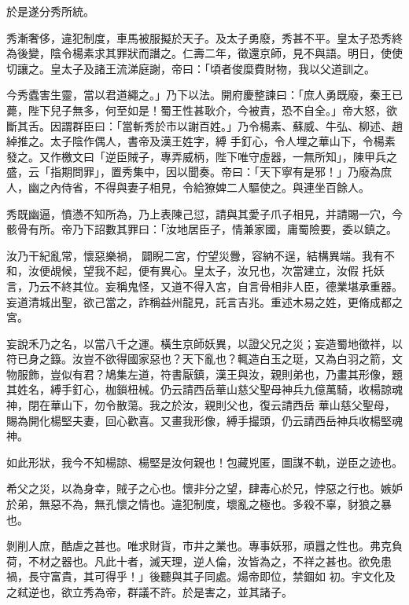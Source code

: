 \begin{pinyinscope}
 於是遂分秀所統。



 秀漸奢侈，違犯制度，車馬被服擬於天子。及太子勇廢，秀甚不平。皇太子恐秀終為後變，陰令楊素求其罪狀而譖之。仁壽二年，徵還京師，見不與語。明日，使使切讓之。皇太子及諸王流涕庭謝，帝曰：「頃者俊糜費財物，我以父道訓之。



 今秀蠹害生靈，當以君道繩之。」乃下以法。開府慶整諫曰：「庶人勇既廢，秦王已薨，陛下兒子無多，何至如是！蜀王性甚耿介，今被責，恐不自全。」帝大怒，欲斷其舌。因謂群臣曰：「當斬秀於市以謝百姓。」乃令楊素、蘇威、牛弘、柳述、趙綽推之。太子陰作偶人，書帝及漢王姓字，縛
 手釘心，令人埋之華山下，令楊素發之。又作檄文曰「逆臣賊子，專弄威柄，陛下唯守虛器，一無所知」，陳甲兵之盛，云「指期問罪」，置秀集中，因以聞奏。帝曰：「天下寧有是邪！」乃廢為庶人，幽之內侍省，不得與妻子相見，令給獠婢二人驅使之。與連坐百餘人。



 秀既幽逼，憤懣不知所為，乃上表陳己愆，請與其愛子爪子相見，并請賜一穴，今骸骨有所。帝乃下詔數其罪曰：「汝地居臣子，情兼家國，庸蜀險要，委以鎮之。



 汝乃干紀亂常，懷惡樂禍，闢睨二宮，佇望災釁，容納不逞，結構異端。我有不和，汝便覘候，望我不起，便有異心。皇太子，汝兄也，次當建立，汝假
 托妖言，乃云不終其位。妄稱鬼怪，又道不得入宮，自言骨相非人臣，德業堪承重器。妄道清城出聖，欲己當之，詐稱益州龍見，託言吉兆。重述木易之姓，更脩成都之宮。



 妄說禾乃之名，以當八千之運。橫生京師妖異，以證父兄之災；妄造蜀地徵祥，以符已身之籙。汝豈不欲得國家惡也？天下亂也？輒造白玉之珽，又為白羽之箭，文物服飾，豈似有君？鳩集左道，符書厭鎮，漢王與汝，親則弟也，乃畫其形像，題其姓名，縛手釘心，枷鎖杻械。仍云請西岳華山慈父聖母神兵九億萬騎，收楊諒魂神，閉在華山下，勿令散蕩。我之於汝，親則父也，復云請西岳
 華山慈父聖母，賜為開化楊堅夫妻，回心歡喜。又畫我形像，縛手撮頭，仍云請西岳神兵收楊堅魂神。



 如此形狀，我今不知楊諒、楊堅是汝何親也！包藏兇匿，圖謀不軌，逆臣之迹也。



 希父之災，以為身幸，賊子之心也。懷非分之望，肆毒心於兄，悖惡之行也。嫉妒於弟，無惡不為，無孔懷之情也。違犯制度，壞亂之極也。多殺不辜，豺狼之暴也。



 剝削人庶，酷虐之甚也。唯求財貨，市井之業也。專事妖邪，頑囂之性也。弗克負荷，不材之器也。凡此十者，滅天理，逆人倫，汝皆為之，不祥之甚也。欲免患禍，長守富貴，其可得乎！」後聽與其子同處。煬帝即位，禁錮如
 初。宇文化及之弒逆也，欲立秀為帝，群議不許。於是害之，並其諸子。




\end{pinyinscope}
